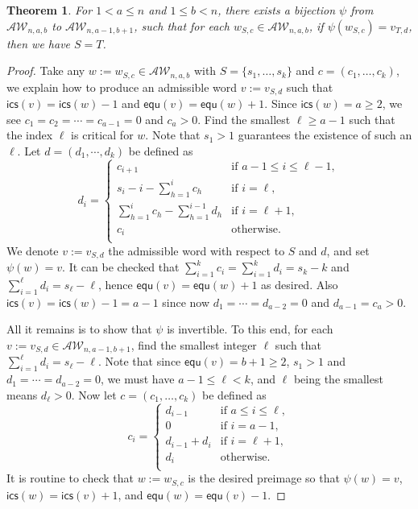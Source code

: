 \documentclass[12pt]{amsart}
\numberwithin{equation}{section}
\theoremstyle{plain}
\newtheorem{theorem}{Theorem}[section]
\theoremstyle{definition}
\def\AW{\mathcal{AW}}
\def\ics{\mathsf{ics}}
\def\equ{\mathsf{equ}}
\begin{document}
\begin{theorem}\label{thm:AW-Hankel}
For $1< a\le n$ and $1\le b< n$, there exists a bijection $\psi$ from $\AW_{n,a,b}$ to $\AW_{n,a-1,b+1}$, such that for each $w_{S,c}\in\AW_{n,a,b}$, if $\psi(w_{S,c})=v_{T,d}$, then we have $S=T$.
\end{theorem}
\begin{proof}
Take any $w:=w_{S,c}\in\AW_{n,a,b}$ with $S=\{s_1,\ldots,s_k\}$ and $c=(c_1,\ldots,c_k)$, we explain how to produce an admissible word $v:=v_{S,d}$ such that $\ics(v)=\ics(w)-1$ and $\equ(v)=\equ(w)+1$. Since $\ics(w)=a\ge 2$, we see $c_1=c_2=\cdots=c_{a-1}=0$ and $c_a>0$. Find the smallest $\ell\ge a-1$ such that the index $\ell$ is critical for $w$. Note that $s_1>1$ guarantees the existence of such an $\ell$. Let $d=(d_1,\cdots,d_k)$ be defined as
$$d_i=\begin{cases}
c_{i+1} & \text{if } a-1\le i\le \ell-1,\\
s_i-i-\sum_{h=1}^{i}c_h & \text{if } i=\ell,\\
\sum_{h=1}^i c_h-\sum_{h=1}^{i-1} d_h & \text{if } i=\ell+1,\\
c_i & \text{otherwise.}\\
\end{cases}$$
We denote $v:=v_{S,d}$ the admissible word with respect to $S$ and $d$, and set $\psi(w)=v$. It can be checked that $\sum_{i=1}^k c_i=\sum_{i=1}^k d_i=s_k-k$ and $\sum_{i=1}^{\ell} d_i=s_{\ell}-\ell$, hence $\equ(v)=\equ(w)+1$ as desired. Also $\ics(v)=\ics(w)-1=a-1$ since now $d_1=\cdots=d_{a-2}=0$ and $d_{a-1}=c_a>0$. 

All it remains is to show that $\psi$ is invertible. To this end, for each $v:=v_{S,d}\in\AW_{n,a-1,b+1}$, find the smallest integer $\ell$ such that $\sum_{i=1}^{\ell} d_i=s_{\ell}-\ell$. Note that since $\equ(v)=b+1\ge 2$, $s_1>1$ and $d_1=\cdots=d_{a-2}=0$, we must have $a-1\le \ell <k$, and $\ell$ being the smallest means $d_{\ell}>0$. Now let $c=(c_1,\ldots,c_k)$ be defined as
$$c_i=\begin{cases}
d_{i-1} & \text{if } a\le i\le \ell,\\
0 & \text{if } i = a-1,\\
d_{i-1}+d_i & \text{if } i=\ell+1,\\
d_i & \text{otherwise.}\\
\end{cases}$$
It is routine to check that $w:=w_{S,c}$ is the desired preimage so that $\psi(w)=v$, $\ics(w)=\ics(v)+1$, and $\equ(w)=\equ(v)-1$. 
\end{proof}
\end{document}
